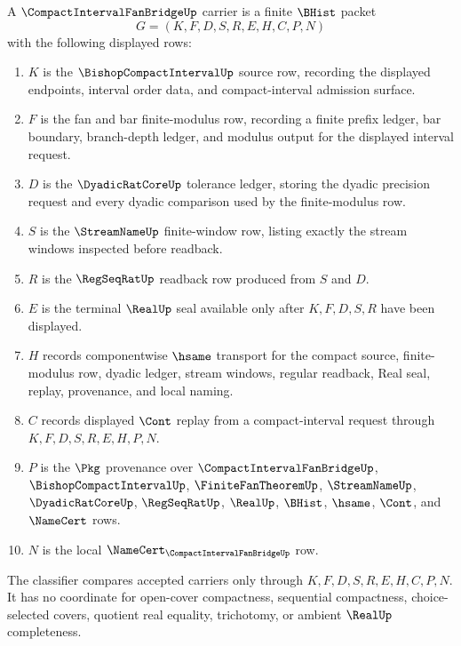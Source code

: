 \begin{definition}
\label{def:compact-interval-fan-bridge-carrier}
A $\CompactIntervalFanBridgeUp$ carrier is a finite $\BHist$ packet
$$
G=(K,F,D,S,R,E,H,C,P,N)
$$
with the following displayed rows:
\begin{enumerate}
\item $K$ is the $\BishopCompactIntervalUp$ source row, recording the displayed endpoints, interval order data, and compact-interval admission surface.
\item $F$ is the fan and bar finite-modulus row, recording a finite prefix ledger, bar boundary, branch-depth ledger, and modulus output for the displayed interval request.
\item $D$ is the $\DyadicRatCoreUp$ tolerance ledger, storing the dyadic precision request and every dyadic comparison used by the finite-modulus row.
\item $S$ is the $\StreamNameUp$ finite-window row, listing exactly the stream windows inspected before readback.
\item $R$ is the $\RegSeqRatUp$ readback row produced from $S$ and $D$.
\item $E$ is the terminal $\RealUp$ seal available only after $K,F,D,S,R$ have been displayed.
\item $H$ records componentwise $\hsame$ transport for the compact source, finite-modulus row, dyadic ledger, stream windows, regular readback, Real seal, replay, provenance, and local naming.
\item $C$ records displayed $\Cont$ replay from a compact-interval request through $K,F,D,S,R,E,H,P,N$.
\item $P$ is the $\Pkg$ provenance over $\CompactIntervalFanBridgeUp$, $\BishopCompactIntervalUp$, $\FiniteFanTheoremUp$, $\StreamNameUp$, $\DyadicRatCoreUp$, $\RegSeqRatUp$, $\RealUp$, $\BHist$, $\hsame$, $\Cont$, and $\NameCert$ rows.
\item $N$ is the local $\NameCert_{\CompactIntervalFanBridgeUp}$ row.
\end{enumerate}
The classifier compares accepted carriers only through $K,F,D,S,R,E,H,C,P,N$. It has no coordinate for open-cover compactness, sequential compactness, choice-selected covers, quotient real equality, trichotomy, or ambient $\RealUp$ completeness.
\end{definition}

